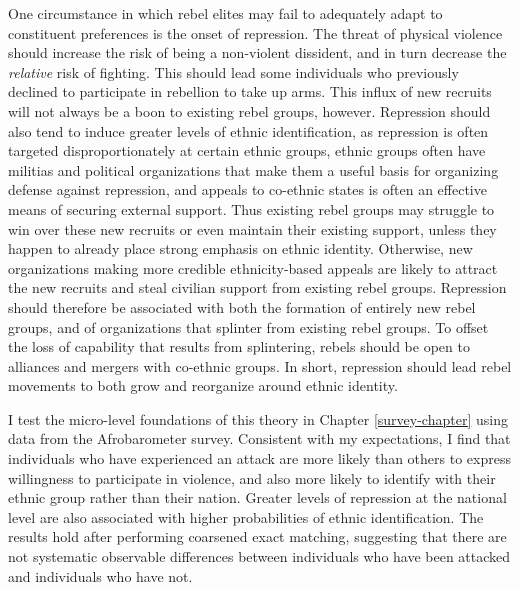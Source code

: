 \documentclass[12pt,]{book}
\theoremstyle{definition}
\theoremstyle{definition}
\theoremstyle{remark}
\begin{document}
One circumstance in which rebel elites may fail to adequately adapt to
constituent preferences is the onset of repression. The threat of
physical violence should increase the risk of being a non-violent
dissident, and in turn decrease the \emph{relative} risk of fighting.
This should lead some individuals who previously declined to participate
in rebellion to take up arms. This influx of new recruits will not
always be a boon to existing rebel groups, however. Repression should
also tend to induce greater levels of ethnic identification, as
repression is often targeted disproportionately at certain ethnic
groups, ethnic groups often have militias and political organizations
that make them a useful basis for organizing defense against repression,
and appeals to co-ethnic states is often an effective means of securing
external support. Thus existing rebel groups may struggle to win over
these new recruits or even maintain their existing support, unless they
happen to already place strong emphasis on ethnic identity. Otherwise,
new organizations making more credible ethnicity-based appeals are
likely to attract the new recruits and steal civilian support from
existing rebel groups. Repression should therefore be associated with
both the formation of entirely new rebel groups, and of organizations
that splinter from existing rebel groups. To offset the loss of
capability that results from splintering, rebels should be open to
alliances and mergers with co-ethnic groups. In short, repression should
lead rebel movements to both grow and reorganize around ethnic identity.

I test the micro-level foundations of this theory in Chapter
\ref{survey-chapter} using data from the Afrobarometer survey.
Consistent with my expectations, I find that individuals who have
experienced an attack are more likely than others to express willingness
to participate in violence, and also more likely to identify with their
ethnic group rather than their nation. Greater levels of repression at
the national level are also associated with higher probabilities of
ethnic identification. The results hold after performing coarsened exact
matching, suggesting that there are not systematic observable
differences between individuals who have been attacked and individuals
who have not.
\end{document}
